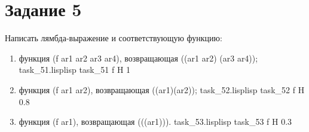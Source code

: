 \section{Задание 5}

Написать лямбда-выражение и соответствующую функцию:

\begin{enumerate}
	\item функция (f ar1 ar2 ar3 ar4), возвращающая ((ar1 ar2) (ar3 ar4));
		{task_51.lisp}{lisp}{}
		{task_51}
		{f}
		{H}
		{1\textwidth}
		{}
	\item функция (f ar1 ar2), возвращающая ((ar1)(ar2));
		{task_52.lisp}{lisp}{}
		{task_52}
		{f}
		{H}
		{0.8\textwidth}
		{}
	\item функция (f ar1), возвращающая (((ar1))).
		{task_53.lisp}{lisp}{}
		{task_53}
		{f}
		{H}
		{0.3\textwidth}
		{}
\end{enumerate}
